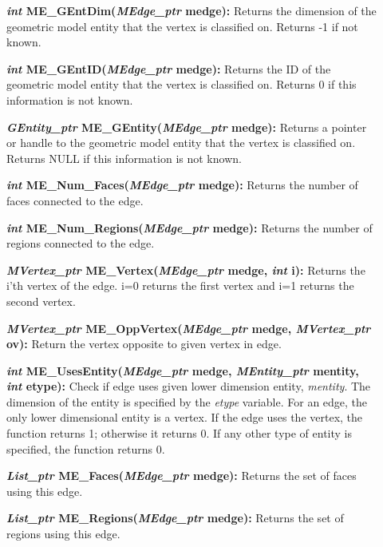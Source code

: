 \documentclass[12pt]{article}
\begin{document}
\begin{description}
\item[]\textbf{\textit{int} ME\_GEntDim(\textit{MEdge\_ptr} medge):} Returns
the dimension of the geometric model entity that the vertex is
classified on. Returns -1 if not known.

\item[]\textbf{\textit{int} ME\_GEntID(\textit{MEdge\_ptr} medge):} Returns
the ID of the geometric model entity that the vertex is classified on.
Returns 0 if this information is not known.

\item[]\textbf{\textit{GEntity\_ptr} ME\_GEntity(\textit{MEdge\_ptr} medge):} Returns
a pointer or handle to the geometric model entity that the vertex is
classified on. Returns NULL if this information is not known.

\item[]\textbf{\textit{int} ME\_Num\_Faces(\textit{MEdge\_ptr} medge):}
Returns the number of faces connected to the edge.

\item[]\textbf{\textit{int} ME\_Num\_Regions(\textit{MEdge\_ptr} medge):}
Returns the number of regions connected to the edge.

\item[]\textbf{\textit{MVertex\_ptr} ME\_Vertex(\textit{MEdge\_ptr} medge,
\textit{int} i):} Returns the i'th vertex of the edge. i=0 returns the
first vertex and i=1 returns the second vertex.

\item[]\textbf{\textit{MVertex\_ptr} ME\_OppVertex(\textit{MEdge\_ptr}
medge, \textit{MVertex\_ptr} ov):} Return the vertex opposite to given
vertex in edge.

\item[]\textbf{\textit{int} ME\_UsesEntity(\textit{MEdge\_ptr} medge,
\textit{MEntity\_ptr} mentity, \textit{int} etype):} Check if edge uses
given lower dimension entity, \textit{mentity}. The dimension of the
entity is specified by the \textit{etype} variable. For an edge, the
only lower dimensional entity is a vertex. If the edge uses the
vertex, the function returns 1; otherwise it returns 0. If any
other type of entity is specified, the function returns 0.


\item[]\textbf{\textit{List\_ptr} ME\_Faces(\textit{MEdge\_ptr} medge):}
Returns the set of faces using this edge.

\item[]\textbf{\textit{List\_ptr} ME\_Regions(\textit{MEdge\_ptr} medge):}
Returns the set of regions using this edge.



\end{description}
\end{document}
